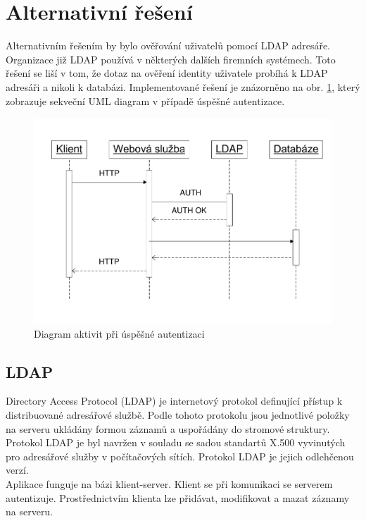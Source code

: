 \documentclass{bakalarka}
\begin{document}
\section{Alternativní řešení}
Alternativním řešením by bylo ověřování uživatelů pomocí LDAP adresáře. Organizace již LDAP používá v některých dalších firemních systémech. Toto řešení se liší v tom, že dotaz na ověření identity uživatele probíhá k LDAP adresáři a nikoli k databázi. Implementované řešení je znázorněno na obr. \ref{obr:authldap}, který zobrazuje sekveční UML diagram v případě úspěšné autentizace.
\begin{figure}[H]
  \centering
  \includegraphics[scale=0.8]{visio/auth_ldap.pdf}
\caption{Diagram aktivit při úspěšné autentizaci}
\label{obr:authldap}
\end{figure}
\subsection{LDAP}
 Directory Access Protocol (LDAP) je internetový protokol definující přístup k distribuované adresářové službě. Podle tohoto protokolu jsou jednotlivé položky na serveru ukládány formou záznamů a uspořádány do stromové struktury. Protokol LDAP je byl navržen v souladu  se sadou standartů X.500 vyvinutých pro adresářové služby v počítačových sítích. Protokol LDAP je jejich odlehčenou verzí.\\ \indent
Aplikace funguje na bázi klient-server. Klient se při komunikaci se serverem autentizuje. Prostřednictvím klienta lze přidávat, modifikovat a mazat záznamy na serveru.
\end{document}

